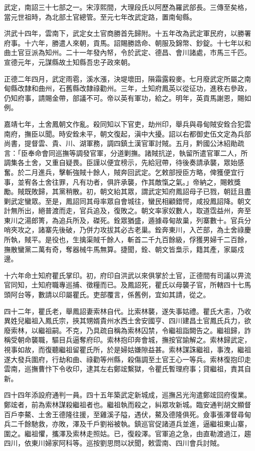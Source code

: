 \begin{pinyinscope}
武定，南詔三十七部之一。宋淳熙間，大理段氏以阿歷為羅武部長。三傳至矣格，當元世祖時，為北部土官總管。至元七年改武定路，置南甸縣。

洪武十四年，雲南下，武定女土官商勝首先歸附。十五年改為武定軍民府，以勝署府事。十六年，勝遣人來朝，貢馬。詔賜勝誥命、朝服及錦幣、鈔錠。十七年以和曲土官豆派為知州。二十一年發內帑，令於武定、德昌、會川諸處，市馬三千匹。宣德元年，元謀縣故土知縣吾忠子政來朝。

正德二年四月，武定雨雹，溪水漲，決堤壞田，隕霜露殺麥。七月廢武定所屬之南甸縣改隸和曲州，石舊縣改隸祿勸州。三年，土知府鳳英以從征功，進秩右參政，仍知府事，請賜金帶，部議不可。帝以英有軍功，給之。明年，英貢馬謝恩，賜如例。

嘉靖七年，土舍鳳朝文作亂。殺同知以下官吏，劫州印，舉兵與尋甸賊安銓合犯雲南府，撫臣以聞。時安銓未平，朝文復起，滇中大擾。詔以右都御史伍文定為兵部尚書，提督雲、貴、川、湖軍務，調四鎮土漢官軍討賊。五月，黔國公沐紹勛疏言：「臣奉命會同巡撫等調發官軍，分道剿撫。諸賊抗逆，執留所遣官軍二人，所調集各土舍，又重自疑畏。臣謹以便宜榜示，先給冠帶，待後奏請承襲，眾始感奮。於二月進兵，擊斬強賊十餘人，賊奔回武定。乞敕部授臣方略，俾獲便宜行事，並宥各土舍往罪，凡有功者，俱許承襲，作其敵愾之氣。」帝納之，賜敕獎勵。賊既敗歸，其黨稍散。初，朝文紿其眾，謂武定知府鳳詔母子已戮，朝廷且盡剿武定蠻眾。至是，鳳詔同其母率眾自會城往，蠻民相顧錯愕，咸投鳳詔降。朝文計無所出，絕普渡而走，官兵追及，復敗之。朝文率家奴數人，取道霑益州，奔至東川之湯郎箐，為追兵所及，磔死。銓眾猶盛，遁據尋甸故巢，列寨數十。官兵分哨夾攻之，諸寨先後破，乃併力攻拔其必古老巢。銓奔東川，入芒部，為土舍祿慶所執，賊平。是役也，生擒渠賊千餘人，斬首二千九百餘級，俘獲男婦千二百餘，撫散蠻黨二萬有奇，奪器械牛馬無算。捷聞，銓、朝文皆梟示，籍其產，家屬戍邊。

十六年命土知府瞿氏掌印。初，府印自洪武以來俱掌於土官，正德間有司議以畀流官同知，土知府職專巡捕、徵糧而已。及鳳詔死，瞿氏以母襲子官，所轄四十七馬頭阿台等，數請以印屬瞿氏。吏部覆言，係舊例，宜如其請，從之。

四十二年，瞿氏老，舉鳳詔妻索林自代。比索林襲，遂失事姑禮。瞿氏大恚，乃收異姓兒繼祖入鳳氏宗，挾其甥婿貴州水西土舍安國亨、四川建昌土官鳳氏兵力，欲廢索林，以繼祖嗣。不克，乃具疏自稱為索林囚禁，令繼祖詣闕告之。繼祖歸，詐稱受朝命襲職，驅目兵逼奪府印。索林抱印奔會城，撫按官諭解之。索林歸武定，視事如故，而復聽繼祖留瞿氏所，於是婦姑嫌隙益甚。索林謀誅繼祖，事洩，繼祖遂大發兵圍府，行劫和曲、祿勸等州縣，殺傷調至土官王心一等兵。索林復抱印走雲南，巡撫曹忭下令收印，逮其左右鄭竤繫獄，令瞿氏暫理府事；貸繼祖，責其自新。

四十四年添設府通判一員。四十五年築武定新城成，巡撫呂光洵遣鄭竤回府復業。鄭竤者，前為索林謀殺繼祖者也。繼祖執而殺之，糾眾攻新城。臨安通判胡文顯督百戶李鰲、土舍王德隆往援，至雞溪子隘，遇伏，鰲及德隆俱死。僉事張澤督尋甸兵二千餘馳救，亦敗，澤及千戶劉裕被執。鎮巡官促諸道兵並進，逼繼祖東山寨，圍之。繼祖懼，攜澤及索林走照姑。已，復殺澤。官軍追之急，由直勒渡過江，趨四川，依東川婦家阿科等。巡按劉思問以狀聞，敕雲南、四川會兵討賊。


\end{pinyinscope}
